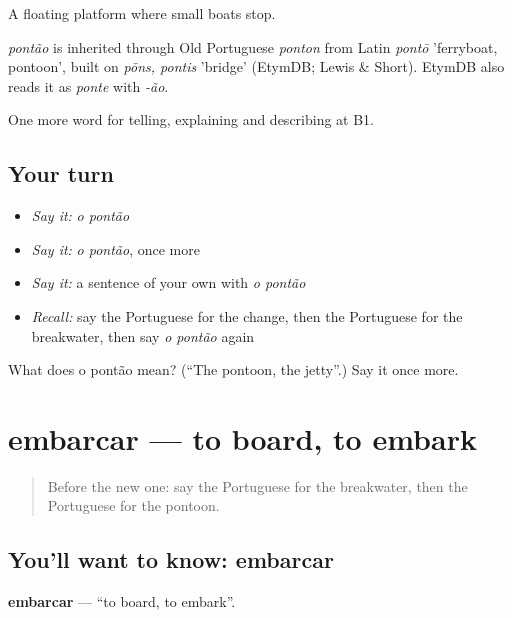 A floating platform where small boats stop.

\begin{cousinweb}
\emph{pontão} is inherited through Old Portuguese \emph{ponton} from Latin \emph{pontō} 'ferryboat, pontoon', built on \emph{pōns, pontis} 'bridge' (EtymDB; Lewis \& Short). EtymDB also reads it as \emph{ponte} with \emph{-ão}.
\end{cousinweb}

\begin{grammarlens}[title={What you've built}]
One more word for telling, explaining and describing at B1.
\end{grammarlens}

\subsection*{Your turn}
\begin{itemize}
\raggedright
  \item \emph{Say it:} \emph{o pontão}
  \item \emph{Say it:} \emph{o pontão}, once more
  \item \emph{Say it:} a sentence of your own with \emph{o pontão}
  \item \emph{Recall:} say the Portuguese for the change, then the Portuguese for the breakwater, then say \emph{o pontão} again
\end{itemize}

\begin{tcolorbox}[breakable,colback=teal!4,colframe=teal!35!black,title={Before you move on}]
What does o pontão mean? (\textquotedblleft{}The pontoon, the jetty\textquotedblright{}.) Say it once more.
\end{tcolorbox}
\section[embarcar]{embarcar — to board, to embark}

\label{lesson:PT-C417-embarcar}



\begin{quote}
Before the new one: say the Portuguese for the breakwater, then the Portuguese for the pontoon.
\end{quote}

\subsection*{You'll want to know: embarcar}
\textbf{embarcar} — \textquotedblleft{}to board, to embark\textquotedblright{}.

